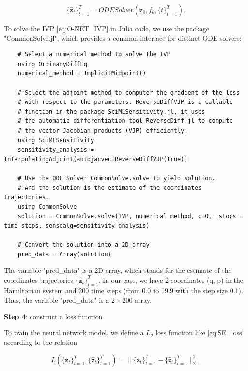 \documentclass[
	parskip, 			   %
	twoside, 			   %
	DIV=14, 			   %
	BCOR=15.0mm, 		   %
	headsepline, 		   %
	open=right, 		   %
	captions=tableheading, %
	bibliography=totoc,    %
	numbers=noenddot       %
]{scrreprt}
\begin{document}
\begin{equation}
    \label{eq:O-NET_ODESolver}
    \{ \mathbf{\hat{z}}_{t} \}_{t=1}^{T} = ODESolver(\mathbf{z}_{0}, f_{\theta}, \{ t \}_{t=1}^{T}).
\end{equation}

To solve the IVP \ref{eq:O-NET_IVP} in Julia code, we use the package "CommonSolve.jl", which provides a common interface for distinct ODE solvers:

\begin{verbatim}
    # Select a numerical method to solve the IVP
    using OrdinaryDiffEq
    numerical_method = ImplicitMidpoint()
    
    # Select the adjoint method to computer the gradient of the loss 
    # with respect to the parameters. ReverseDiffVJP is a callable 
    # function in the package SciMLSensitivity.jl, it uses 
    # the automatic differentiation tool ReverseDiff.jl to compute 
    # the vector-Jacobian products (VJP) efficiently. 
    using SciMLSensitivity
    sensitivity_analysis = InterpolatingAdjoint(autojacvec=ReverseDiffVJP(true))
    
    # Use the ODE Solver CommonSolve.solve to yield solution. 
    # And the solution is the estimate of the coordinates trajectories.
    using CommonSolve
    solution = CommonSolve.solve(IVP, numerical_method, p=θ, tstops = time_steps, sensealg=sensitivity_analysis)
    
    # Convert the solution into a 2D-array
    pred_data = Array(solution)
\end{verbatim}

The variable "pred\_data" is a 2D-array, which stands for the estimate of the coordinates trajectories $\{ \mathbf{\hat{z}}_{t} \}_{t=1}^{T}$. In our case, we have 2 coordinates (q, p) in the Hamiltonian system and 200 time steps (from 0.0 to 19.9 with the step size 0.1). Thus, the variable "pred\_data" is a $2 \times 200$ array.

\textbf{Step 4}: construct a loss function

To train the neural network model, we define a $L_{2}$ loss function like \ref{eq:SE_loss} according to the relation

\begin{equation}
    \label{eq:loss_O-NET}
     L(\{ \mathbf{z}_{t} \}_{t=1}^{T}, \{ \mathbf{\hat{z}}_{t} \}_{t=1}^{T}) = \lVert \{ \mathbf{z}_{t} \}_{t=1}^{T} - \{ \mathbf{\hat{z}}_{t} \}_{t=1}^{T} \rVert_{2}^{2},
\end{equation}
\end{document}

